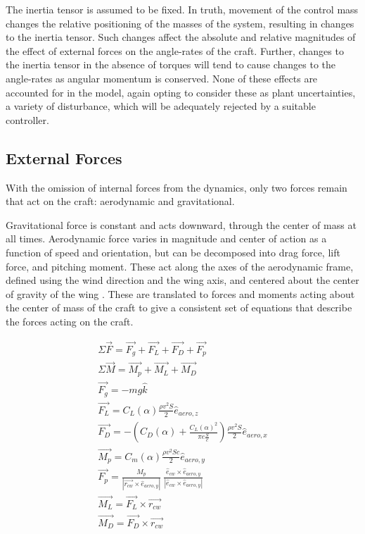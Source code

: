 \documentclass{sydeStyle}
\begin{document}
The inertia tensor is assumed to be fixed. In truth, movement of the control
mass changes the relative positioning of the masses of the system, resulting in
changes to the inertia tensor. Such changes affect the absolute and relative
magnitudes of the effect of external forces on the angle-rates of the craft.
Further, changes to the inertia tensor in the absence of torques will tend to
cause changes to the angle-rates as angular momentum is conserved. None of these
effects are accounted for in the model, again opting to consider these as plant
uncertainties, a variety of disturbance, which will be adequately rejected by a suitable
controller.

\subsection{External Forces}

With the omission of internal forces from the dynamics, only two forces remain
that act on the craft: aerodynamic and gravitational.

Gravitational force is constant and acts downward, through the center of mass at
all times. Aerodynamic force varies in magnitude and center of action as a
function of speed and orientation, but can be decomposed into drag force, lift
force, and pitching moment. These act along the axes of the aerodynamic frame,
defined using the wind direction and the wing axis, and centered about the
center of gravity of the wing \cite{etkin}. These are translated to forces
and moments acting about the center of mass of the craft to give a consistent
set of equations that describe the forces acting on the craft.

\begin{eqnarray*}
\Sigma \vec{F} = \vec{F_g} + \vec{F_L} + \vec{F_D} + \vec{F_p} \\
\Sigma \vec{M} = \vec{M_p} + \vec{M_L} + \vec{M_D} \\
\vec{F_g} = -mg\hat{k} \\
\vec{F_L} = C_L(\alpha) \frac{\rho v^2 S}{2}\hat{e}_{aero,z} \\
\vec{F_D} = -(C_D(\alpha) + \frac{C_L(\alpha)^2}{\pi e \frac{S}{c}})\frac{\rho v^2 S}{2}\hat{e}_{aero,x} \\
\vec{M_p} = C_m(\alpha) \frac{\rho v^2 S c}{2} \hat{e}_{aero,y} \\
\vec{F_p} = \frac{M_p}{| \vec{r_{cw}} \times \hat{e}_{aero,y} |} \
    \frac{\hat{e}_{cw} \times \hat{e}_{aero,y}}{|\hat{e}_{cw} \times \hat{e}_{aero,y}|} \\
\vec{M_L} = \vec{F_L} \times \vec{r_{cw}} \\
\vec{M_D} = \vec{F_D} \times \vec{r_{cw}} \\
\end{eqnarray*}
\end{document}
